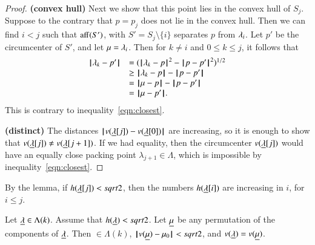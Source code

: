 \begin{proof}
{\bf (convex hull)}  Next we show that this point lies in the convex hull of $S_j$.
Suppose to the contrary that $p=p_j$ does not lie in the convex hull. Then we can find $i<j$ such that ${\operatorname{aff}}(S')$, with $S'=S_j\setminus\{i\}$ separates $p$ from $\lambda_i$.  Let $p'$ be the circumcenter of $S'$, and let $\mu=\lambda_i$.  Then for $k\ne i$ and $0\le k\le j$, it follows that
$$
\begin{array}{lll}
\norm{\lam_k}{p'} &= (\norm{\lam_k}{p}^2 - \norm{p}{p'}^2)^{1/2} \\
  &\ge \norm{\lam_k}{p} - \norm{p}{p'} \\
  &=\norm{\mu}{p} - \norm{p}{p'}\\
  &=\norm{\mu}{p'}.
\end{array}
$$
This is contrary to inequality~\ref{eqn:closest}.


{\bf (distinct)}  The distances ${\hskip0.1em|\hskip-0.15em|\hskip0.1em}v({\underline{\lambda}}[j]) - v({\underline{\lambda}}[0]){\hskip0.1em|\hskip-0.15em|\hskip0.1em}$ are increasing, so it is enough to show
that $v({\underline{\lambda}}[j])\ne v({\underline{\lambda}}[j+1])$.  If we had equality, then the circumcenter $v({\underline{\lambda}}[j])$
would have an equally close packing point $\lambda_{j+1}\in\Lambda$, which is impossible by inequality~\ref{eqn:closest}.
\end{proof}





By the lemma, if $h({\underline{\lambda}}[j])<sqrt2$, then the numbers $h({\underline{\lambda}}[i])$ are increasing in $i$, for $i\le j$.


\begin{lemma}   
Let ${\underline{\lambda}}\in\Lambda(k)$.  Assume that $h({\underline{\lambda}})<sqrt2$. Let ${\underline{\mu}}$ be any permutation of the components of ${\underline{\lambda}}$.  
Then $\bm\in\Lambda(k)$, ${\hskip0.1em|\hskip-0.15em|\hskip0.1em}v({\underline{\mu}}) - \mu_0{\hskip0.1em|\hskip-0.15em|\hskip0.1em}<sqrt2$, and  $v({\underline{\lambda}}) = v({\underline{\mu}})$.
\end{lemma}

